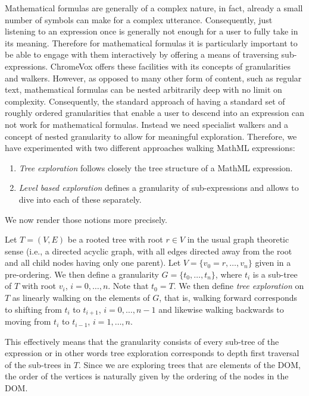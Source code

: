 \documentclass{sig-alternate}
\begin{document}
Mathematical formulas are generally of a complex nature, in fact, already a
small number of symbols can make for a complex utterance.  Consequently, just
listening to an expression once is generally not enough for a user to fully take
in its meaning.  Therefore for mathematical formulas it is particularly
important to be able to engage with them interactively by offering a means of
traversing sub-expressions.  ChromeVox offers these facilities with its concepts
of granularities and walkers. However, as opposed to many other form of content,
such as regular text, mathematical formulas can be nested arbitrarily deep with
no limit on complexity. Consequently, the standard approach of having a standard
set of roughly ordered granularities that enable a user to descend into an
expression can not work for mathematical formulas. Instead we need specialist
walkers and a concept of nested granularity to allow for meaningful
exploration. Therefore, we have experimented with two different approaches
walking MathML expressions:
\begin{enumerate}[(1)]
\item \emph{Tree exploration} follows closely the tree structure of a MathML expression.
\item \emph{Level based exploration} defines a granularity of
  sub-ex\-pressions and allows to dive into each of these separately.
\end{enumerate}
We now render those notions more precisely.

Let $T=(V,E)$ be a rooted tree with root $r\in V$ in the usual graph theoretic
sense (i.e., a directed acyclic graph, with all edges directed away from the
root and all child nodes having only one parent).  Let $V=\{v_0=r,\ldots,v_n\}$
given in a pre-ordering. We then define a granularity $G=\{t_0,\ldots, t_n\}$,
where $t_i$ is a sub-tree of $T$ with root $v_i$, $i=0,\ldots,n$. Note that
$t_0=T$. We then define \emph{tree exploration} on $T$ as linearly walking on
the elements of $G$, that is, walking forward corresponds to shifting from $t_i$
to $t_{i+1}$, $i=0,\ldots,n-1$ and likewise walking backwards to moving from
$t_i$ to $t_{i-1}$, $i=1,\ldots, n$.

This effectively means that the granularity consists of every sub-tree of the
expression or in other words tree exploration corresponds to depth first
traversal of the sub-trees in $T$. Since we are exploring trees that are
elements of the DOM, the order of the vertices is naturally given by the
ordering of the nodes in the DOM.
\end{document}
